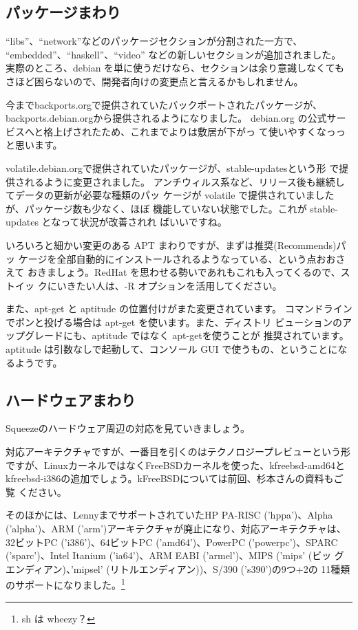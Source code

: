 \documentclass[mingoth,a4paper]{jsarticle}
\begin{document}
\subsection{パッケージまわり}

``libs''、``network''などのパッケージセクションが分割された一方で、
``embedded''、``haskell''、``video'' などの新しいセクションが追加されました。
実際のところ、debian を単に使うだけなら、セクションは余り意識しなくても
さほど困らないので、開発者向けの変更点と言えるかもしれません。

今までbackports.orgで提供されていたバックポートされたパッケージが、
backports.debian.orgから提供されるようになりました。
debian.org の公式サービスへと格上げされたため、これまでよりは敷居が下がっ
て使いやすくなっっと思います。

volatile.debian.orgで提供されていたパッケージが、stable-updatesという形
で提供されるように変更されました。
アンチウィルス系など、リリース後も継続してデータの更新が必要な種類のパッ
ケージが volatile で提供されていましたが、パッケージ数も少なく、ほぼ
機能していない状態でした。これが stable-updates となって状況が改善されれ
ばいいですね。

いろいろと細かい変更のある APT まわりですが、まずは推奨(Recommends)パッ
ケージを全部自動的にインストールされるようなっている、という点おおさえて
おきましょう。RedHat を思わせる勢いであれもこれも入ってくるので、ストイッ
クにいきたい人は、-R オプションを活用してください。

また、apt-get と aptitude の位置付けがまた変更されています。
コマンドラインでポンと投げる場合は apt-get を使います。また、ディストリ
ビューションのアップグレードにも、aptitude ではなく apt-getを使うことが
推奨されています。
aptitude は引数なしで起動して、コンソール GUI で使うもの、ということにな
るようです。

\subsection{ハードウェアまわり}

Squeezeのハードウェア周辺の対応を見ていきましょう。

対応アーキテクチャですが、一番目を引くのはテクノロジープレビューという形
ですが、LinuxカーネルではなくFreeBSDカーネルを使った、kfreebsd-amd64と
kfreebsd-i386の追加でしょう。kFreeBSDについては前回、杉本さんの資料もご覧
ください。

そのほかには、LennyまでサポートされていたHP PA-RISC ('hppa')、Alpha
('alpha')、ARM ('arm')アーキテクチャが廃止になり、対応アーキテクチャは、
32ビットPC ('i386')、64ビットPC ('amd64')、PowerPC ('powerpc')、SPARC
('sparc')、Intel Itanium ('ia64')、ARM EABI ('armel')、MIPS ('mips' (ビッ
グエンディアン)、'mipsel' (リトルエンディアン))、S/390 ('s390')の9つ+2の
11種類のサポートになりました。\footnote{sh は wheezy？}
\end{document}
